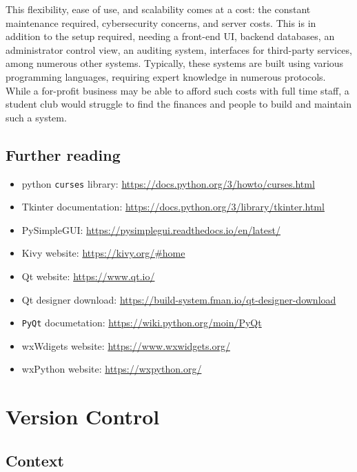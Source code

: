 \documentclass[11pt]{article}
\begin{document}
This flexibility, ease of use, and scalability comes at a cost: the constant maintenance required, cybersecurity concerns, and \gls{server} costs. This is in addition to the setup required, needing a front-end UI, backend databases, an administrator control view, an auditing system, interfaces for third-party services, among numerous other systems. Typically, these systems are built using various programming languages, requiring expert knowledge in numerous protocols. While a for-profit business may be able to afford such costs with full time staff, a student club would struggle to find the finances and people to build and maintain such a system.

\subsection{Further reading}

\begin{itemize}
    \item \Gls{python} \texttt{curses} \gls{library}: \url{https://docs.python.org/3/howto/curses.html}
    \item Tkinter documentation: \url{https://docs.python.org/3/library/tkinter.html}
    \item PySimpleGUI: \url{https://pysimplegui.readthedocs.io/en/latest/}
    \item Kivy website: \url{https://kivy.org/#home}
    \item Qt website: \url{https://www.qt.io/}
    \item Qt designer download: \url{https://build-system.fman.io/qt-designer-download}
    \item \texttt{PyQt} documetation: \url{https://wiki.python.org/moin/PyQt}
    \item wxWdigets website: \url{https://www.wxwidgets.org/}
    \item wxPython website: \url{https://wxpython.org/}
\end{itemize}

\newpage

\section{Version Control}

\subsection{Context}
\end{document}
